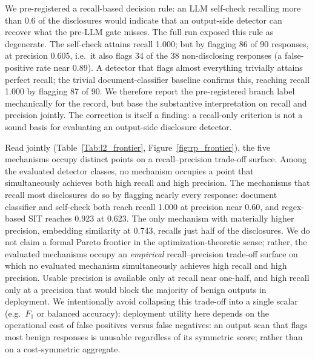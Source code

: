 \documentclass[journal]{IEEEtran}
\begin{document}
We pre-registered a recall-based decision rule: an LLM self-check recalling
more than 0.6 of the disclosures would indicate that an output-side detector can
recover what the pre-LLM gate misses. The full run exposed this rule as
degenerate. The self-check attains recall 1.000; but by flagging 86 of 90
responses, at precision 0.605, i.e.\ it also flags 34 of the 38 non-disclosing
responses (a false-positive rate near 0.89). A detector that flags almost
everything trivially attains perfect recall; the trivial document-classifier
baseline confirms this, reaching recall 1.000 by flagging 87 of 90. We therefore
report the pre-registered branch label mechanically for the record, but base the
substantive interpretation on recall and precision jointly. The correction is
itself a finding: a recall-only criterion is not a sound basis for evaluating an
output-side disclosure detector.

Read jointly (Table~\ref{Tab:l2_frontier}, Figure~\ref{fig:rp_frontier}), the
five mechanisms occupy distinct points on a recall--precision trade-off surface.
Among the evaluated detector classes, no mechanism occupies a point that
simultaneously achieves both high recall and high precision. The mechanisms that recall most disclosures
do so by flagging nearly every response: document classifier and self-check
both reach recall 1.000 at precision near 0.60, and regex-based SIT reaches
0.923 at 0.623. The only mechanism with materially higher precision, embedding
similarity at 0.743, recalls just half of the disclosures. We do not claim a
formal Pareto frontier in the optimization-theoretic sense; rather, the
evaluated mechanisms occupy an \emph{empirical} recall--precision trade-off
surface on which no evaluated mechanism simultaneously achieves high recall and
high precision. Usable precision is available only at recall near one-half, and
high recall only at a precision that would block the majority of benign outputs
in deployment. We intentionally avoid collapsing this trade-off into a single
scalar (e.g.\ $F_1$ or balanced accuracy): deployment utility here depends on
the operational cost of false positives versus false negatives: an output scan
that flags most benign responses is unusable regardless of its symmetric
score; rather than on a cost-symmetric aggregate.
\end{document}
